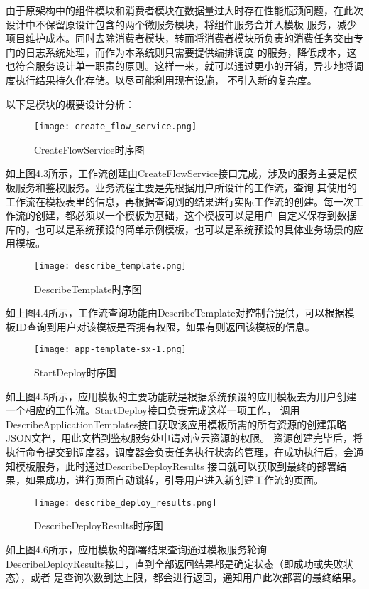 由于原架构中的组件模块和消费者模块在数据量过大时存在性能瓶颈问题，在此次设计中不保留原设计包含的两个微服务模块，将组件服务合并入模板
服务，减少项目维护成本。同时去除消费者模块，转而将消费者模块所负责的消费任务交由专门的日志系统处理，而作为本系统则只需要提供编排调度
的服务，降低成本，这也符合服务设计单一职责的原则。这样一来，就可以通过更小的开销，异步地将调度执行结果持久化存储。以尽可能利用现有设施，
不引入新的复杂度。

以下是模块的概要设计分析：

\begin{figure}[H]
    \centering
    \texttt{[image: create\_flow\_service.png]}
    \caption{CreateFlowService时序图}
    \label{fig:CreateFlowService时序图}
    \note{}
\end{figure}

如上图4.3所示，工作流创建由CreateFlowService接口完成，涉及的服务主要是模板服务和鉴权服务。业务流程主要是先根据用户所设计的工作流，查询
其使用的工作流在模板表里的信息，再根据查询到的结果进行实际工作流的创建。每一次工作流的创建，都必须以一个模板为基础，这个模板可以是用户
自定义保存到数据库的，也可以是系统预设的简单示例模板，也可以是系统预设的具体业务场景的应用模板。


\begin{figure}[H]
    \centering
    \texttt{[image: describe\_template.png]}
    \caption{DescribeTemplate时序图}
    \label{fig:DescribeTemplate时序图}
    \note{}
\end{figure}

如上图4.4所示，工作流查询功能由DescribeTemplate对控制台提供，可以根据模板ID查询到用户对该模板是否拥有权限，如果有则返回该模板的信息。



\begin{figure}[H]
    \centering
    \texttt{[image: app-template-sx-1.png]}
    \caption{StartDeploy时序图}
    \label{fig:StartDeploy时序图}
\end{figure}
如上图4.5所示，应用模板的主要功能就是根据系统预设的应用模板去为用户创建一个相应的工作流。StartDeploy接口负责完成这样一项工作，
调用DescribeApplicationTemplates接口获取该应用模板所需的所有资源的创建策略JSON文档，用此文档到鉴权服务处申请对应云资源的权限。
资源创建完毕后，将执行命令提交到调度器，调度器会负责任务执行状态的管理，在成功执行后，会通知模板服务，此时通过DescribeDeployResults
接口就可以获取到最终的部署结果，如果成功，进行页面自动跳转，引导用户进入新创建工作流的页面。

\begin{figure}[h]
    \centering
    \texttt{[image: describe\_deploy\_results.png]}
    \caption{DescribeDeployResults时序图}
    \label{fig:DescribeDeployResults时序图}
\end{figure}
如上图4.6所示，应用模板的部署结果查询通过模板服务轮询DescribeDeployResults接口，直到全部返回结果都是确定状态（即成功或失败状态），或者
是查询次数到达上限，都会进行返回，通知用户此次部署的最终结果。

